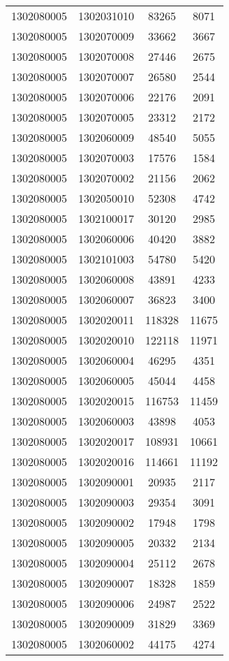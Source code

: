 \begin{longtable}{llcc}
1302080005 & 1302031010 & 83265 & 8071\\
1302080005 & 1302070009 & 33662 & 3667\\
1302080005 & 1302070008 & 27446 & 2675\\
1302080005 & 1302070007 & 26580 & 2544\\
1302080005 & 1302070006 & 22176 & 2091\\
1302080005 & 1302070005 & 23312 & 2172\\
1302080005 & 1302060009 & 48540 & 5055\\
1302080005 & 1302070003 & 17576 & 1584\\
1302080005 & 1302070002 & 21156 & 2062\\
1302080005 & 1302050010 & 52308 & 4742\\
1302080005 & 1302100017 & 30120 & 2985\\
1302080005 & 1302060006 & 40420 & 3882\\
1302080005 & 1302101003 & 54780 & 5420\\
1302080005 & 1302060008 & 43891 & 4233\\
1302080005 & 1302060007 & 36823 & 3400\\
1302080005 & 1302020011 & 118328 & 11675\\
1302080005 & 1302020010 & 122118 & 11971\\
1302080005 & 1302060004 & 46295 & 4351\\
1302080005 & 1302060005 & 45044 & 4458\\
1302080005 & 1302020015 & 116753 & 11459\\
1302080005 & 1302060003 & 43898 & 4053\\
1302080005 & 1302020017 & 108931 & 10661\\
1302080005 & 1302020016 & 114661 & 11192\\
1302080005 & 1302090001 & 20935 & 2117\\
1302080005 & 1302090003 & 29354 & 3091\\
1302080005 & 1302090002 & 17948 & 1798\\
1302080005 & 1302090005 & 20332 & 2134\\
1302080005 & 1302090004 & 25112 & 2678\\
1302080005 & 1302090007 & 18328 & 1859\\
1302080005 & 1302090006 & 24987 & 2522\\
1302080005 & 1302090009 & 31829 & 3369\\
1302080005 & 1302060002 & 44175 & 4274\\

\end{longtable}
